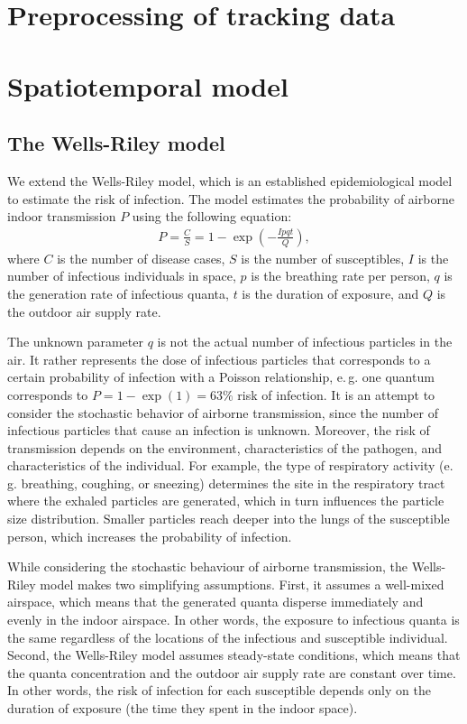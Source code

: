 \documentclass[fleqn,11pt]{wlscirep_supp}
\newcommand\eg{e.\,g.\xspace}
\begin{document}
\section{Preprocessing of tracking data}\label{}

\clearpage

\section{Spatiotemporal model}\label{sec:spattemp-model}

\subsection{The Wells-Riley model}

We extend the Wells-Riley model\cite{Riley1978AJE}, which is an established epidemiological model to estimate the risk of infection. The model estimates the probability of airborne indoor transmission $P$ using the following equation: 
\begin{align}
    P = \frac{C}{S} = 1 - \exp \left(-\frac{Ipqt}{Q}\right),
\end{align}
where $C$ is the number of disease cases, $S$ is the number of susceptibles, $I$ is the number of infectious individuals in space, $p$ is the breathing rate per person, $q$ is the generation rate of infectious quanta, $t$ is the duration of exposure, and $Q$ is the outdoor air supply rate. 

The unknown parameter $q$ is not the actual number of infectious particles in the air. It rather represents the dose of infectious particles that corresponds to a certain probability of infection with a Poisson relationship, \eg one quantum corresponds to $P = 1 - \exp (1) = 63\%$ risk of infection\cite{Rudnick2003IndoorAir}. It is an attempt to consider the stochastic behavior of airborne transmission, since the number of infectious particles that cause an infection is unknown. Moreover, the risk of transmission depends on the environment, characteristics of the pathogen, and characteristics of the individual. For example, the type of respiratory activity (\eg breathing, coughing, or sneezing) determines the site in the respiratory tract where the exhaled particles are generated, which in turn influences the particle size distribution\cite{Wei2016AMJIC}. Smaller particles reach deeper into the lungs of the susceptible person\cite{Wang2021Science}, which increases the probability of infection. 

While considering the stochastic behaviour of airborne transmission, the Wells-Riley model makes two simplifying assumptions. First, it assumes a well-mixed airspace, which means that the generated quanta disperse immediately and evenly in the indoor airspace. In other words, the exposure to infectious quanta is the same regardless of the locations of the infectious and susceptible individual. Second, the Wells-Riley model assumes steady-state conditions, which means that the quanta concentration and the outdoor air supply rate are constant over time. In other words, the risk of infection for each susceptible depends only on the duration of exposure (the time they spent in the indoor space). 
\end{document}
